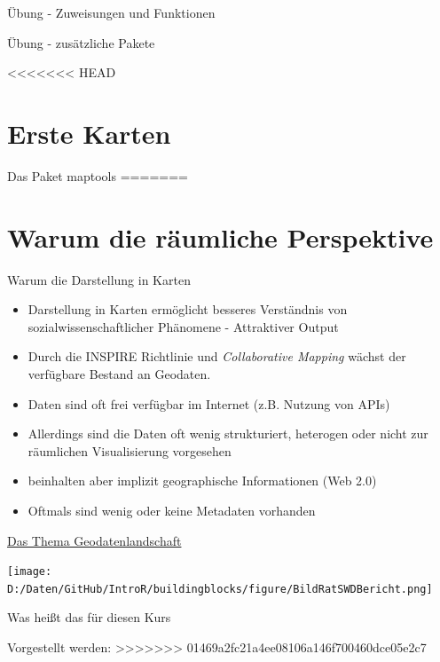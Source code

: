 \documentclass[ignorenonframetext,]{beamer}
\begin{document}
\begin{frame}[fragile]{Übung - Zuweisungen und Funktionen}
\begin{frame}{Übung - zusätzliche Pakete}
\end{frame}

<<<<<<< HEAD
\hypertarget{erste-karten}{%
\section{Erste Karten}\label{erste-karten}}

\begin{frame}[fragile]{Das Paket maptools}
\protect\hypertarget{das-paket-maptools}{}
=======
\section{Warum die räumliche
Perspektive}\label{warum-die-raumliche-perspektive}

\begin{frame}{Warum die Darstellung in Karten}

\begin{itemize}
\item
  Darstellung in Karten ermöglicht besseres Verständnis von
  sozialwissenschaftlicher Phänomene - Attraktiver Output
\item
  Durch die INSPIRE Richtlinie und \emph{Collaborative Mapping} wächst
  der verfügbare Bestand an Geodaten.
\item
  Daten sind oft frei verfügbar im Internet (z.B. Nutzung von APIs)
\item
  Allerdings sind die Daten oft wenig strukturiert, heterogen oder nicht
  zur räumlichen Visualisierung vorgesehen
\item
  beinhalten aber implizit geographische Informationen (Web 2.0)
\item
  Oftmals sind wenig oder keine Metadaten vorhanden
\end{itemize}

\end{frame}

\begin{frame}{\href{https://www.ratswd.de/dl/downloads/RatSWD_Geodatenbericht.pdf}{Das
Thema Geodatenlandschaft}}

\texttt{[image: D:/Daten/GitHub/IntroR/buildingblocks/figure/BildRatSWDBericht.png]}

\end{frame}

\begin{frame}{Was heißt das für diesen Kurs}

\begin{block}{Vorgestellt werden:}
>>>>>>> 01469a2fc21a4ee08106a146f700460dce05e2c7


\end{block}
\end{frame}
\end{frame}
\end{frame}
\end{document}
